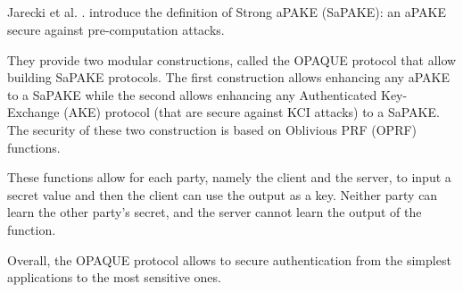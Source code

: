 \documentclass[../report.tex]{subfiles}
\begin{document}



\subsection{}


\paragraph{}
Jarecki et al. \cite{OPAQUE_Paper}. introduce the definition of Strong aPAKE (SaPAKE): an aPAKE secure against pre-computation attacks.

They provide two modular constructions, called the OPAQUE protocol that allow building SaPAKE protocols. The first construction allows enhancing any aPAKE to a SaPAKE while the second allows enhancing any Authenticated Key-Exchange (AKE) protocol (that are secure against KCI attacks) to a SaPAKE.
The security of these two construction is based on Oblivious PRF (OPRF) functions. %

These functions allow for each party, namely the client and the server, to input a secret value and then the client can use the output as a key. Neither party can learn the other party's secret, and the server cannot learn the output of the function.

Overall, the OPAQUE protocol allows to secure authentication from the simplest applications to the most sensitive ones.





% 
% 
% 


\paragraph{}
\end{document}
